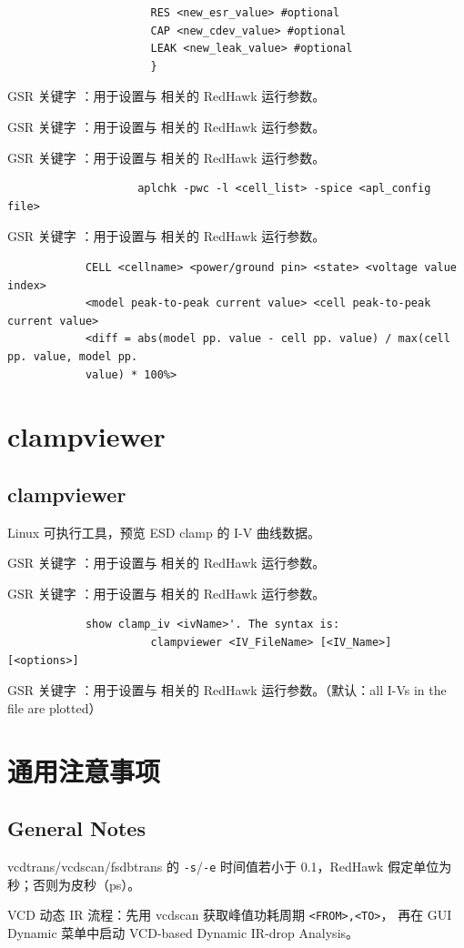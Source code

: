 \begin{lstlisting}
                      RES <new_esr_value> #optional
                      CAP <new_cdev_value> #optional
                      LEAK <new_leak_value> #optional
                      }
\end{lstlisting}

GSR 关键字 ：用于设置与  相关的 RedHawk 运行参数。

GSR 关键字 ：用于设置与  相关的 RedHawk 运行参数。

GSR 关键字 ：用于设置与  相关的 RedHawk 运行参数。

\begin{lstlisting}
                    aplchk -pwc -l <cell_list> -spice <apl_config file>
\end{lstlisting}

GSR 关键字 ：用于设置与  相关的 RedHawk 运行参数。

\begin{lstlisting}
            CELL <cellname> <power/ground pin> <state> <voltage value index>
            <model peak-to-peak current value> <cell peak-to-peak current value>
            <diff = abs(model pp. value - cell pp. value) / max(cell pp. value, model pp.
            value) * 100%>
\end{lstlisting}

\section{clampviewer}
\subsection*{clampviewer}

Linux 可执行工具，预览 ESD clamp 的 I-V 曲线数据。

GSR 关键字 ：用于设置与  相关的 RedHawk 运行参数。

GSR 关键字 ：用于设置与  相关的 RedHawk 运行参数。

\begin{lstlisting}
            show clamp_iv <ivName>'. The syntax is:
                      clampviewer <IV_FileName> [<IV_Name>] [<options>]
\end{lstlisting}

GSR 关键字 ：用于设置与  相关的 RedHawk 运行参数。（默认：all I-Vs in the file are plotted）

\section{通用注意事项}
\subsection*{General Notes}

\begin{noteBox}
vcdtrans/vcdscan/fsdbtrans 的 \texttt{-s}/\texttt{-e} 时间值若小于 0.1，RedHawk 假定单位为秒；否则为皮秒（ps）。
\end{noteBox}

\begin{tipBox}
VCD 动态 IR 流程：先用 vcdscan 获取峰值功耗周期 \texttt{<FROM>,<TO>}，
再在 GUI Dynamic 菜单中启动 VCD-based Dynamic IR-drop Analysis。
\end{tipBox}
